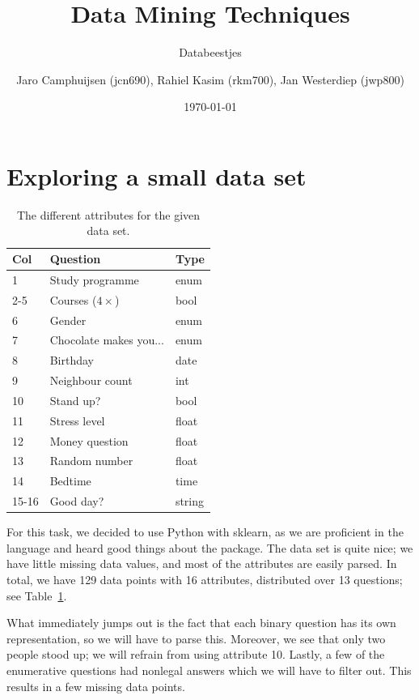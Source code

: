 \documentclass[runningheads,a4paper]{llncs}
\author{Jaro Camphuijsen (jcn690), Rahiel Kasim (rkm700), Jan Westerdiep (jwp800)}
\date{\today}
\title{Data Mining Techniques}
\subtitle{Databeestjes}
\begin{document}
\maketitle

\section{Exploring a small data set}
\begin{table}
\vspace{-50pt}
  \begin{tabular}{lll}\\\toprule
   Col &Question & Type\\\midrule
  	1& Study programme &enum\\ 
  	2-5&Courses ($4 \times$) &bool \\ 
  6 &Gender &enum \\
  7 &Chocolate makes you... &enum \\
  8 &Birthday &date \\
  9 &Neighbour count &int \\
  10 &Stand up? &bool \\
  11 &Stress level &float \\
  12 &Money question &float\\
  13 &Random number &float \\
  14 &Bedtime &time \\
  15-16 &Good day? &string\\\bottomrule
  \end{tabular}
  \caption{The different attributes for the given data set.}
  \label{tbl:attribs}
  \vspace{-50pt}
\end{table}

For this task, we decided to use Python with sklearn, as we are proficient in the language and heard good things about the package.  The data set is quite nice; we have little missing data values, and most of the attributes are easily parsed.  In total, we have 129 data points with 16 attributes, distributed over 13 questions; see Table~\ref{tbl:attribs}.

What immediately jumps out is the fact that each binary question has its own representation, so we will have to parse this.  Moreover, we see that only two people stood up; we will refrain from using attribute 10.  Lastly, a few of the enumerative questions had nonlegal answers which we will have to filter out.  This results in a few missing data points.
\end{document}
